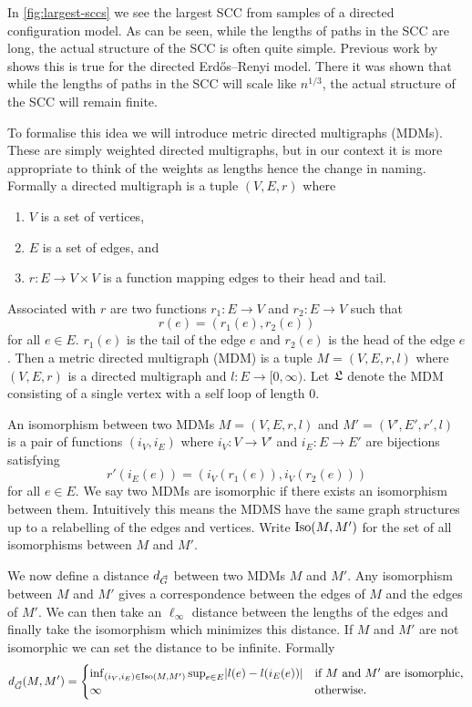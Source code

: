 In \cref{fig:largest-sccs} we see the largest SCC from samples of a directed configuration model. As can be seen, while the lengths of paths in the SCC are long, the actual structure of the SCC is often quite simple. Previous work by \citet{goldschmidtScalingLimitCritical2019} shows this is true for the directed Erdős--Renyi model. There it was shown that while the lengths of paths in the SCC will scale like $n^{1/3}$, the actual structure of the SCC will remain finite.

To formalise this idea we will introduce metric directed multigraphs (MDMs). These are simply weighted directed multigraphs, but in our context it is more appropriate to think of the weights as lengths hence the change in naming. Formally a directed multigraph is a tuple $(V, E, r)$ where
\begin{enumerate}
    \item $V$ is a set of vertices,
    \item $E$ is a set of edges, and
    \item $r: E \to V \times V$ is a function mapping edges to their head and tail.
\end{enumerate}
Associated with $r$ are two functions $r_1: E \to V$ and $r_2: E \to V$ such that
\begin{equation*}
    r(e) = (r_1(e), r_2(e))
\end{equation*}
for all $e \in E$. $r_1(e)$ is the tail of the edge $e$ and $r_2(e)$ is the head of the edge $e$. Then a metric directed multigraph (MDM) is a tuple $M = (V, E, r, l)$ where $(V, E, r)$ is a directed multigraph and $l:E \to [0, \infty)$. Let $\mathfrak L$ denote the MDM consisting of a single vertex with a self loop of length 0.

An isomorphism between two MDMs $M = (V, E, r, l)$ and $M' = (V', E', r', l)$ is a pair of functions $(i_V, i_E)$ where $i_V: V \to V'$ and $i_E: E \to E'$ are bijections satisfying
\begin{equation*}
    r'(i_E(e)) = (i_V(r_1(e)), i_V(r_2(e)))
\end{equation*}
for all $e \in E$. We say two MDMs are isomorphic if there exists an isomorphism between them. Intuitively this means the MDMS have the same graph structures up to a relabelling of the edges and vertices. Write $\operatorname{Iso}(M, M')$ for the set of all isomorphisms between $M$ and $M'$.

We now define a distance $d_{\vec{G}}$ between two MDMs $M$ and $M'$.  Any isomorphism between $M$ and $M'$ gives a correspondence between the edges of $M$ and the edges of $M'$. We can then take an $\ell_{\infty}$ distance between the lengths of the edges and finally take the isomorphism which minimizes this distance. If $M$ and $M'$ are not isomorphic we can set the distance to be infinite. Formally
\begin{equation*}
    d_{\vec{G}}(M, M') = \begin{cases}
        \inf_{(i_V, i_E) \in \operatorname{Iso}(M, M')} \sup_{e \in E} \lvert l(e) - l(i_E(e))\rvert & \text{if $M$ and $M'$ are isomorphic,} \\
        \infty & \text{otherwise.}
    \end{cases}
\end{equation*}

